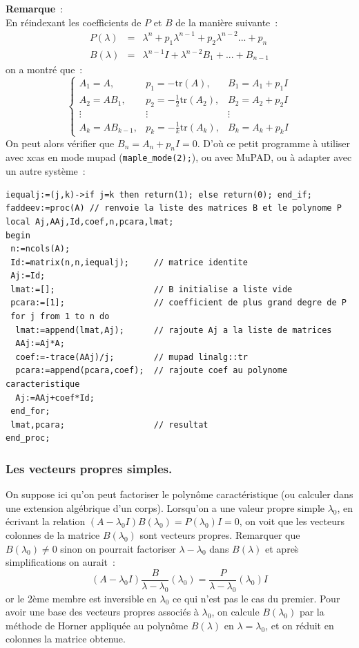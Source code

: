 \documentclass[a4paper,11pt]{article}
\begin{document}
{\bf Remarque}~:\\
En réindexant les coefficients de $P$ et $B$ de la manière suivante~:
\begin{eqnarray*}
P(\lambda) &=& \lambda^n+p_1\lambda^{n-1}+p_2\lambda^{n-2}...+p_n \\
B(\lambda) &=& \lambda^{n-1}I+\lambda^{n-2}B_1+...+B_{n-1}
\end{eqnarray*}
on a montré que~:
\[ \left\{
\begin{array}{ccc}
A_1=A, & p_1=-\mbox{tr}(A), & B_1=A_1+p_1I \\  
A_2=AB_1, & p_2=-\frac{1}{2}\mbox{tr}(A_2), & B_2=A_2+p_2I \\ 
\vdots & \vdots & \vdots \\
A_k=AB_{k-1}, & p_k=-\frac{1}{k}\mbox{tr}(A_k), & B_k=A_k+p_kI
\end{array}
\right.\]
On peut alors vérifier que $B_n=A_n+p_nI=0$.
D'où ce petit programme à utiliser avec xcas en mode mupad 
(\verb|maple_mode(2);|), ou avec MuPAD, ou à adapter
avec un autre système~:
\begin{verbatim}
iequalj:=(j,k)->if j=k then return(1); else return(0); end_if;
faddeev:=proc(A) // renvoie la liste des matrices B et le polynome P
local Aj,AAj,Id,coef,n,pcara,lmat;
begin
 n:=ncols(A);
 Id:=matrix(n,n,iequalj);     // matrice identite
 Aj:=Id;
 lmat:=[];                    // B initialise a liste vide
 pcara:=[1];                  // coefficient de plus grand degre de P
 for j from 1 to n do
  lmat:=append(lmat,Aj);      // rajoute Aj a la liste de matrices
  AAj:=Aj*A;
  coef:=-trace(AAj)/j;        // mupad linalg::tr
  pcara:=append(pcara,coef);  // rajoute coef au polynome caracteristique
  Aj:=AAj+coef*Id;
 end_for;
 lmat,pcara;                  // resultat
end_proc;
\end{verbatim}

\subsubsection{Les vecteurs propres simples.}
On suppose ici qu'on peut factoriser le polyn\^ome caract\'eristique
(ou calculer dans une extension alg\'ebrique d'un corps).
Lorsqu'on a une valeur propre simple $\lambda_0$, en \'ecrivant
la relation $(A-\lambda_0 I)B(\lambda_0)=P(\lambda_0)I=0$,
on voit que les vecteurs colonnes de la matrice $B(\lambda_0)$
sont vecteurs propres.
Remarquer que $B(\lambda_0) \neq 0$ sinon on pourrait factoriser
$\lambda-\lambda_0$ dans $B(\lambda)$ et apre\`s simplifications on aurait~:
\[(A-\lambda_0 I)\frac{B}{\lambda-\lambda_0}(\lambda_0)=
\frac{P}{\lambda-\lambda_0}(\lambda_0)I \]
or le 2\`eme membre est inversible en $\lambda_0$ ce qui n'est pas le
cas du premier.
Pour avoir une base des vecteurs propres associ\'es \`a $\lambda_0$, on
calcule $B(\lambda_0) $ par la m\'ethode de Horner appliqu\'ee au
polyn\^ome $B(\lambda)$ en $\lambda=\lambda_0$, et on r\'eduit en
colonnes la matrice obtenue.
\end{document}
